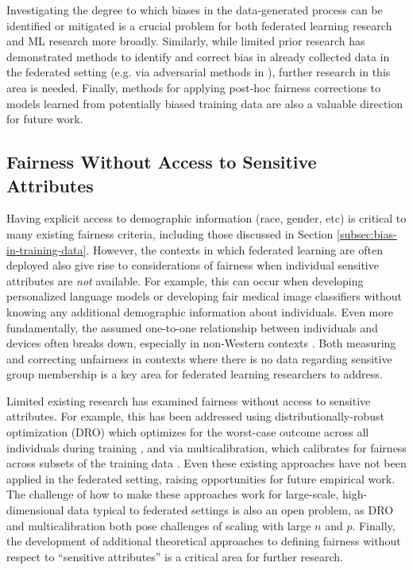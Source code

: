 \documentclass[11pt]{article}
\begin{document}
Investigating the degree to which biases in the data-generated process can be identified or mitigated is a crucial problem for both federated learning research and ML research more broadly. Similarly, while limited prior research has demonstrated methods to identify and correct bias in already collected data in the federated setting (e.g. via adversarial methods in \cite{kairouz20learning}), further research in this area is needed. Finally, methods for applying post-hoc fairness corrections to models learned from potentially biased training data are also a valuable direction for future work.

\subsection{Fairness Without Access to Sensitive Attributes}\label{subsec:fairness-without-sensitive-attributes}

Having explicit access to demographic information (race, gender, etc) is critical to many existing fairness criteria, including those discussed in Section \ref{subsec:bias-in-training-data}. However, the contexts in which federated learning are often deployed also give rise to considerations of fairness when individual sensitive attributes are \textit{not} available. For example, this can occur when developing personalized language models or developing fair medical image classifiers without knowing any additional demographic information about individuals. Even more fundamentally, the assumed one-to-one relationship between individuals and devices often breaks down, especially in non-Western contexts \cite{sambasivan2018privacy}. Both measuring and correcting unfairness in contexts where there is no data regarding sensitive group membership is a key area for federated learning researchers to address.

Limited existing research has examined fairness without access to sensitive attributes. For example, this has been addressed using distributionally-robust optimization (DRO) which optimizes for the worst-case outcome across all individuals during training \cite{hashimoto2018fairness}, and via multicalibration, which calibrates for fairness across subsets of the training data \cite{hebert2018multicalibration}. Even these existing approaches have not been applied in the federated setting, raising opportunities for future empirical work. The challenge of how to make these approaches work for large-scale, high-dimensional data typical to federated settings is also an open problem, as DRO and multicalibration both pose challenges of scaling with large $n$ and $p$. Finally, the development of additional theoretical approaches to defining fairness without respect to ``sensitive attributes'' is a critical area for further research.
\end{document}
